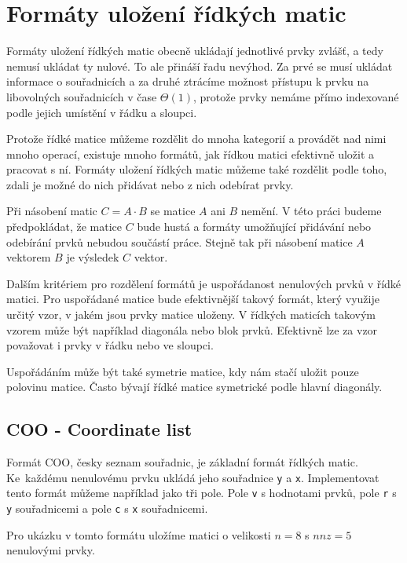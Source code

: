 \chapter{Formáty uložení řídkých matic}


Formáty uložení řídkých matic obecně ukládají jednotlivé prvky zvlášť, a tedy nemusí ukládat ty nulové. To ale přináší řadu nevýhod. Za prvé se musí ukládat informace o souřadnicích a za druhé ztrácíme možnost přístupu k prvku na libovolných souřadnicích v čase $\Theta(1)$, protože prvky nemáme přímo indexované podle jejich umístění v řádku a sloupci.

Protože řídké matice můžeme rozdělit do mnoha kategorií a provádět nad nimi mnoho operací, existuje mnoho formátů, jak řídkou matici efektivně uložit a pracovat s ní. Formáty uložení řídkých matic můžeme také rozdělit podle toho, zdali je možné do nich přidávat nebo z nich odebírat prvky.

Při násobení matic $C = A \cdot B$ se matice $A$ ani $B$ nemění. V této práci budeme předpokládat, že matice $C$ bude hustá a formáty umožňující přidávání nebo odebírání prvků nebudou součástí práce. Stejně tak při násobení matice $A$ vektorem $B$ je výsledek $C$ vektor.

Dalším kritériem pro rozdělení formátů je uspořádanost nenulových prvků v řídké matici. Pro uspořádané matice bude efektivnější takový formát, který využije určitý vzor, v jakém jsou prvky matice uloženy. V řídkých maticích takovým vzorem může být například diagonála nebo blok prvků. Efektivně lze za vzor považovat i prvky v řádku nebo ve sloupci.

Uspořádáním může být také symetrie matice, kdy nám stačí uložit pouze polovinu matice. Často bývají řídké matice symetrické podle hlavní diagonály.

\section{COO - Coordinate list}

Formát COO, česky seznam souřadnic, je základní formát řídkých matic. Ke~každému nenulovému prvku ukládá jeho souřadnice \texttt{y} a \texttt{x}. Implementovat tento formát můžeme například jako tři pole. Pole \texttt{v} s hodnotami prvků, pole \texttt{r} s \texttt{y} souřadnicemi a pole \texttt{c} s \texttt{x} souřadnicemi.

Pro ukázku v tomto formátu uložíme matici o velikosti $n=8$ s $nnz=5$ nenulovými prvky.

